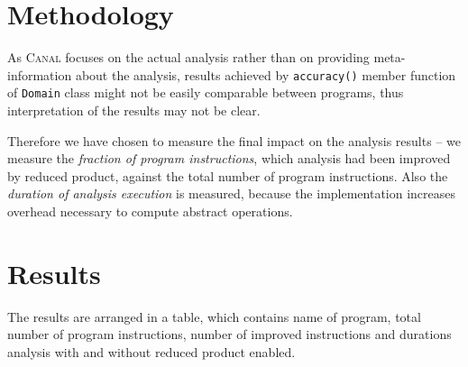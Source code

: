 \documentclass[12pt,oneside]{fithesis2}
\theoremstyle{definition}
\begin{document}
\section{Methodology}

As \textsc{Canal} focuses on the actual analysis rather than on providing meta-information about the analysis, results achieved by \texttt{accuracy()} member function of \texttt{Domain} class might not be easily comparable between programs, thus interpretation of the results may not be clear.

Therefore we have chosen to measure the final impact on the analysis results -- we measure the \textit{fraction of program instructions}, which analysis had been improved by reduced product, against the total number of program instructions. Also the \textit{duration of analysis execution} is measured, because the implementation increases overhead necessary to compute abstract operations.

\section{Results}

The results are arranged in a table, which contains name of program, total number of program instructions, number of improved instructions and durations analysis with and without reduced product enabled.
\end{document}
